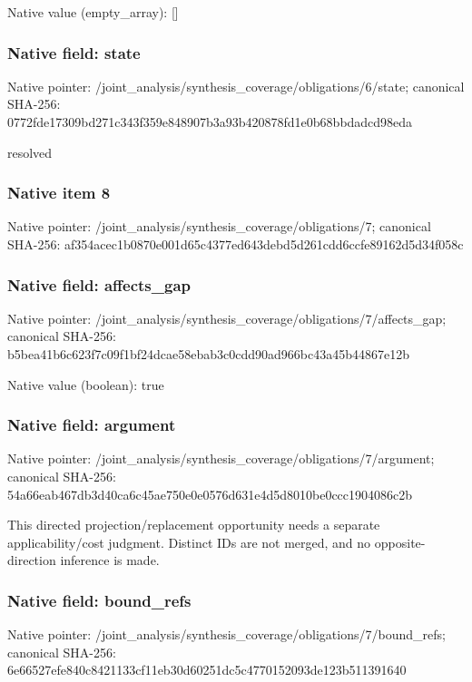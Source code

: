 \documentclass[10pt,a4paper]{article}
\begin{document}
Native value (empty\_\allowbreak{}array): []

\subsubsection{Native field: state}
Native pointer: /joint\_\allowbreak{}analysis/synthesis\_\allowbreak{}coverage/obligations/6/state; canonical SHA-256: 0772fde17309bd271c343f359e848907b3a93b420878fd1e0b68bbdadcd98eda

\begingroup\raggedright\sloppy resolved\par\endgroup

\subsubsection{Native item 8}
Native pointer: /joint\_\allowbreak{}analysis/synthesis\_\allowbreak{}coverage/obligations/7; canonical SHA-256: af354acec1b0870e001d65c4377ed643debd5d261cdd6ccfe89162d5d34f058c

\subsubsection{Native field: affects\_\allowbreak{}gap}
Native pointer: /joint\_\allowbreak{}analysis/synthesis\_\allowbreak{}coverage/obligations/7/affects\_\allowbreak{}gap; canonical SHA-256: b5bea41b6c623f7c09f1bf24dcae58ebab3c0cdd90ad966bc43a45b44867e12b

Native value (boolean): true

\subsubsection{Native field: argument}
Native pointer: /joint\_\allowbreak{}analysis/synthesis\_\allowbreak{}coverage/obligations/7/argument; canonical SHA-256: 54a66eab467db3d40ca6c45ae750e0e0576d631e4d5d8010be0ccc1904086c2b

\begingroup\raggedright\sloppy This directed projection/\allowbreak{}replacement opportunity needs a separate applicability/\allowbreak{}cost judgment. Distinct IDs are not merged,\allowbreak{} and no opposite-direction inference is made.\par\endgroup

\subsubsection{Native field: bound\_\allowbreak{}refs}
Native pointer: /joint\_\allowbreak{}analysis/synthesis\_\allowbreak{}coverage/obligations/7/bound\_\allowbreak{}refs; canonical SHA-256: 6e66527efe840c8421133cf11eb30d60251dc5c4770152093de123b511391640
\end{document}
